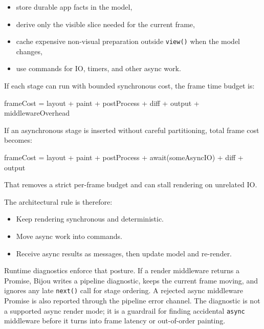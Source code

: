 \begin{itemize}
\tightlist
\item
  store durable app facts in the model,
\item
  derive only the visible slice needed for the current frame,
\item
  cache expensive non-visual preparation outside \texttt{v\allowbreak{}i\allowbreak{}e\allowbreak{}w\allowbreak{}(\allowbreak{})} when the model changes,
\item
  use commands for IO, timers, and other async work.
\end{itemize}

If each stage can run with bounded synchronous cost, the frame time budget is:

\begin{CodeBlock}
frameCost = layout + paint + postProcess + diff + output + middlewareOverhead
\end{CodeBlock}

If an asynchronous stage is inserted without careful partitioning, total frame cost becomes:

\begin{CodeBlock}
frameCost = layout + paint + postProcess + await(someAsyncIO) + diff + output
\end{CodeBlock}

That removes a strict per-frame budget and can stall rendering on unrelated IO.

The architectural rule is therefore:

\begin{itemize}
\tightlist
\item
  Keep rendering synchronous and deterministic.
\item
  Move async work into commands.
\item
  Receive async results as messages, then update model and re-render.
\end{itemize}

Runtime diagnostics enforce that posture. If a render middleware returns a Promise, Bijou writes a pipeline diagnostic, keeps the current frame moving, and ignores any late \texttt{n\allowbreak{}e\allowbreak{}x\allowbreak{}t\allowbreak{}(\allowbreak{})} call for stage ordering. A rejected async middleware Promise is also reported through the pipeline error channel. The diagnostic is not a supported async render mode; it is a guardrail for finding accidental \texttt{a\allowbreak{}s\allowbreak{}y\allowbreak{}n\allowbreak{}c} middleware before it turns into frame latency or out-of-order painting.


